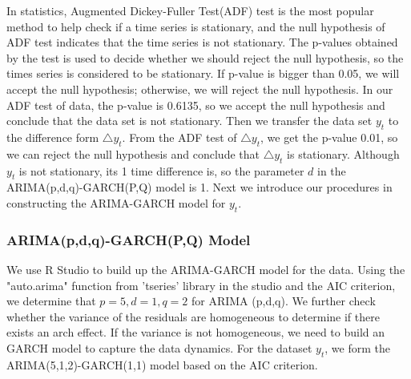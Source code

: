 In statistics, Augmented  Dickey-Fuller Test(ADF) test is the most popular method to help check if a time series is stationary, and the null hypothesis of ADF test indicates that the time series is not stationary.  The p-values obtained by the test is used to decide whether we should reject the null hypothesis, so the times series is considered to be stationary. If p-value is bigger than 0.05, we will accept the null hypothesis; otherwise, we will reject the null hypothesis. In our ADF test of data, the p-value is 0.6135,  so we accept the null hypothesis and conclude that the data set is not stationary. Then we transfer the data set $y_t$ to the difference form $\triangle$$y_t$. From the ADF test of $\triangle$$y_t$,  we get the p-value 0.01, so we can reject the null hypothesis and conclude that $\triangle$$y_t$ is stationary. Although $y_t$ is not stationary, its 1 time difference is, so the parameter $d$ in the ARIMA(p,d,q)-GARCH(P,Q) model is 1. Next we introduce our procedures in constructing the ARIMA-GARCH model for $y_t$. 

\subsubsection{ARIMA(p,d,q)-GARCH(P,Q) Model}
 We use R Studio to build up the ARIMA-GARCH model for the data. Using the "auto.arima" function from 'tseries' library in the studio and the AIC criterion, we determine that $p=5, d=1, q=2$ for ARIMA (p,d,q). We further check whether  the variance of the residuals are homogeneous to determine if there exists an arch effect. If the variance is not homogeneous,  we need to build an GARCH model to capture the data dynamics. For the dataset ${y_t}$, we form the ARIMA(5,1,2)-GARCH(1,1) model based on the AIC criterion.




